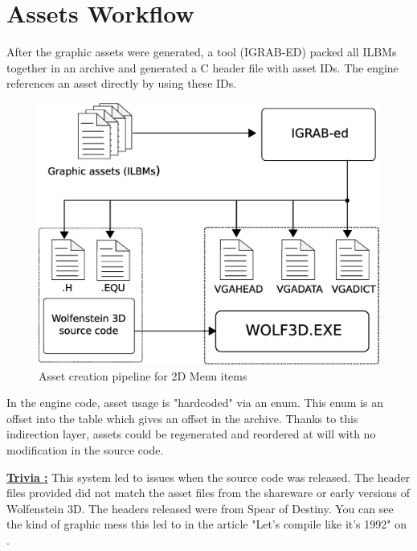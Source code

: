 \documentclass[book.tex]{subfiles}
\begin{document}
\section{Assets Workflow}
After the graphic assets were generated, a tool (IGRAB-ED) packed all ILBMs together in an archive and generated a C header file with asset IDs. The engine references an asset directly by using these IDs.\\
\begin{figure}[H]
\centering
 \includegraphics[width=.9\textwidth]{imgs/drawings/drawing_plain.eps}
 \caption{Asset creation pipeline for 2D Menu items}
\end{figure}
\par
\begin{minipage}{\textwidth}
 \par
 \end{minipage}
 
 In the engine code, asset usage is "hardcoded" via an enum. This enum is an offset into the 
  table which gives an offset in the  archive. Thanks to this indirection layer, assets could be regenerated and reordered at will with no modification in the source code.\\
 \par
 \begin{minipage}{\textwidth}
 \par
 \end{minipage}
\par
\textbf{\underline{Trivia :}} This system led to issues when the source code was released. The  header files provided did not match the asset files from the shareware or early versions of Wolfenstein 3D. The headers released were from Spear of Destiny. You can see the kind of graphic mess this led to in the article "Let's compile like it's 1992" on .\\
\end{document}
